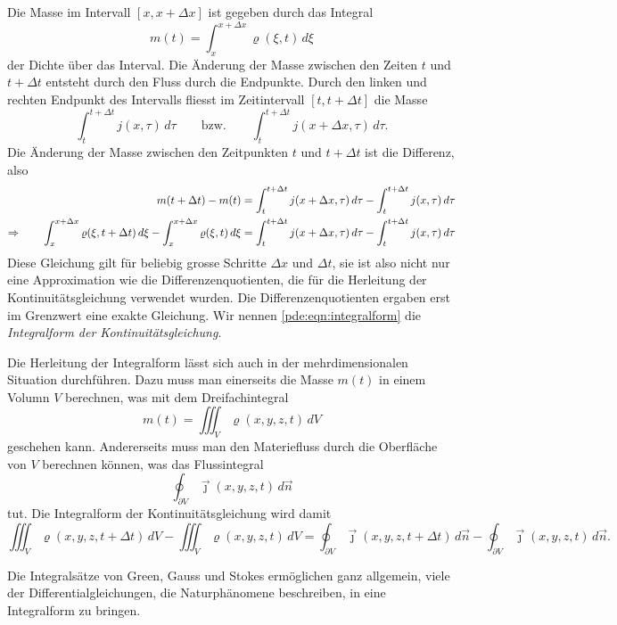Die Masse im Intervall $[x,x+\Delta x]$ ist gegeben durch das Integral
\[
m(t) = \int_x^{x+\Delta x} \varrho(\xi, t) \,d\xi
\]
der Dichte über das Interval.
%
Die Änderung der Masse zwischen den Zeiten $t$ und $t+\Delta t$ entsteht
durch den Fluss durch die Endpunkte.
%
Durch den linken und rechten Endpunkt des Intervalls fliesst im Zeitintervall
$[t,t+\Delta t]$ die Masse
\[
\int_t^{t+\Delta t} j(x,\tau)\,d\tau
\qquad\text{bzw.}\qquad
\int_t^{t+\Delta t} j(x+\Delta x,\tau)\,d\tau.
\]
Die Änderung der Masse zwischen den Zeitpunkten $t$ und $t+\Delta t$
ist die Differenz, also
\begin{align}
m(t+\Delta t)-m(t)
&=
\int_t^{t+\Delta t}j(x+\Delta x,\tau)\,d\tau
-
\int_t^{t+\Delta t}j(x,\tau)\,d\tau
\notag
\\
\Rightarrow\qquad
\int_x^{x+\Delta x} \varrho(\xi,t+\Delta t)\,d\xi
-
\int_x^{x+\Delta x} \varrho(\xi,t)\,d\xi
&=
\int_t^{t+\Delta t}j(x+\Delta x,\tau)\,d\tau
-
\int_t^{t+\Delta t}j(x,\tau)\,d\tau
\label{pde:eqn:integralform}
\end{align}
Diese Gleichung gilt für beliebig grosse Schritte $\Delta x$ und
$\Delta t$, sie ist also nicht nur eine Approximation wie die
Differenzenquotienten, die für die Herleitung der Kontinuitätsgleichung
verwendet wurden. 
Die Differenzenquotienten ergaben erst im Grenzwert eine exakte
Gleichung.
Wir nennen 
\eqref{pde:eqn:integralform}
die {\em Integralform der Kontinuitätsgleichung}.

Die Herleitung der Integralform lässt sich auch in der mehrdimensionalen
Situation durchführen.
Dazu muss man einerseits die Masse $m(t)$ in einem Volumn $V$ berechnen,
was mit dem Dreifachintegral
\[
m(t)
=
\iiint_V \varrho(x,y,z,t) \,dV
\]
geschehen kann.
Andererseits muss man den Materiefluss durch die Oberfläche von $V$
berechnen können, was das Flussintegral
\[
\oint_{\partial V} \vec{\jmath}(x,y,z,t) \,d\vec{n}
\]
tut.
%
%
Die Integralform der Kontinuitätsgleichung wird damit
\[
\iiint_V \varrho(x,y,z,t+\Delta t) \,dV
-
\iiint_V \varrho(x,y,z,t) \,dV
=
\oint_{\partial V} \vec{\jmath}(x,y,z,t+\Delta t)\,d\vec{n}
-
\oint_{\partial V} \vec{\jmath}(x,y,z,t)\,d\vec{n}.
\]

Die Integralsätze von Green, Gauss und Stokes ermöglichen ganz allgemein,
viele der Differentialgleichungen, die Naturphänomene beschreiben, in
eine Integralform zu bringen.
%
%
%
%
%


